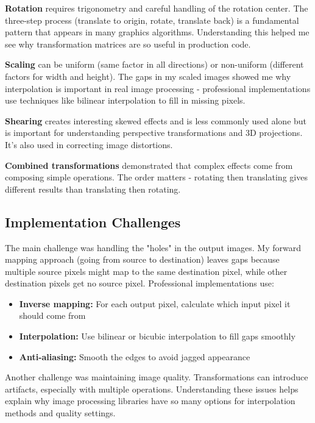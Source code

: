 \documentclass[12pt,a4paper]{report}
\begin{document}
\textbf{Rotation} requires trigonometry and careful handling of the rotation center. The three-step process (translate to origin, rotate, translate back) is a fundamental pattern that appears in many graphics algorithms. Understanding this helped me see why transformation matrices are so useful in production code.

\textbf{Scaling} can be uniform (same factor in all directions) or non-uniform (different factors for width and height). The gaps in my scaled images showed me why interpolation is important in real image processing - professional implementations use techniques like bilinear interpolation to fill in missing pixels.

\textbf{Shearing} creates interesting skewed effects and is less commonly used alone but is important for understanding perspective transformations and 3D projections. It's also used in correcting image distortions.

\textbf{Combined transformations} demonstrated that complex effects come from composing simple operations. The order matters - rotating then translating gives different results than translating then rotating.

\subsection*{Implementation Challenges}

The main challenge was handling the "holes" in the output images. My forward mapping approach (going from source to destination) leaves gaps because multiple source pixels might map to the same destination pixel, while other destination pixels get no source pixel. Professional implementations use:

\begin{itemize}
    \item \textbf{Inverse mapping:} For each output pixel, calculate which input pixel it should come from
    \item \textbf{Interpolation:} Use bilinear or bicubic interpolation to fill gaps smoothly
    \item \textbf{Anti-aliasing:} Smooth the edges to avoid jagged appearance
\end{itemize}

Another challenge was maintaining image quality. Transformations can introduce artifacts, especially with multiple operations. Understanding these issues helps explain why image processing libraries have so many options for interpolation methods and quality settings.
\end{document}
